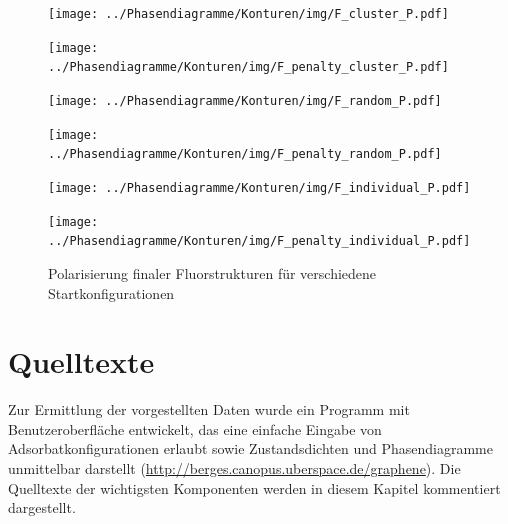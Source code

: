 \documentclass[a4paper, 10pt, twoside, openany]{book} %
\begin{document}
	\begin{figure}
		\begin{minipage}[t]{0.48\textwidth}
			\texttt{[image: ../Phasendiagramme/Konturen/img/F\_cluster\_P.pdf]}
			\label{F_cluster_P}
		\end{minipage}
		\hfill
		\begin{minipage}[t]{0.48\textwidth}
			\texttt{[image: ../Phasendiagramme/Konturen/img/F\_penalty\_cluster\_P.pdf]}
			\label{F_penalty_cluster_P}
		\end{minipage}
		\begin{minipage}[t]{0.48\textwidth}
			\texttt{[image: ../Phasendiagramme/Konturen/img/F\_random\_P.pdf]}
			\label{F_random_P}
		\end{minipage}
		\hfill
		\begin{minipage}[t]{0.48\textwidth}
			\texttt{[image: ../Phasendiagramme/Konturen/img/F\_penalty\_random\_P.pdf]}
			\label{F_penalty_random_P}
		\end{minipage}
		\begin{minipage}[t]{0.48\textwidth}
			\texttt{[image: ../Phasendiagramme/Konturen/img/F\_individual\_P.pdf]}
			\label{F_individual_P}
		\end{minipage}
		\hfill
		\begin{minipage}[t]{0.48\textwidth}
			\texttt{[image: ../Phasendiagramme/Konturen/img/F\_penalty\_individual\_P.pdf]}
			\label{F_penalty_individual_P}
		\end{minipage}
		\caption[Polarisierung finaler Fluorstrukturen]{Polarisierung finaler Fluorstrukturen für verschiedene Startkonfigurationen}
		\label{F_P}
	\end{figure}
	
	\chapter{Quelltexte}
	
	Zur Ermittlung der vorgestellten Daten wurde ein Programm mit Benutzeroberfläche entwickelt, das eine einfache Eingabe von Adsorbatkonfigurationen erlaubt sowie Zustandsdichten und Phasendiagramme unmittelbar darstellt (\url{http://berges.canopus.uberspace.de/graphene}). Die Quelltexte der wichtigsten Komponenten werden in diesem Kapitel kommentiert dargestellt.
	
\end{document}
